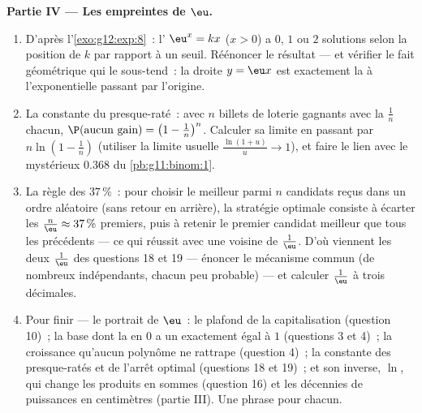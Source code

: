 \begin{problem}
\medskip
\noindent\textbf{Partie IV --- Les empreintes de $\eu$.}
\begin{enumerate}[resume]
  \item D'après l'\cref{exo:g12:exp:8}~: l' $\eu^x = kx$
        ($x > 0$) a $0$, $1$ ou $2$ solutions selon la position de
        $k$ par rapport à un seuil. Réénoncer le résultat --- et
        vérifier le fait géométrique qui le sous-tend~: la droite
        $y = \eu x$ est exactement la  à l'exponentielle
        passant par l'origine.
  \item La constante du presque-raté~: avec $n$ billets de loterie
        gagnants avec la  $\frac1n$ chacun,
        $\P(\text{aucun gain}) = \left(1 - \frac1n\right)^n$.
        Calculer sa limite en passant par
        $n \ln\!\left(1 - \frac1n\right)$ (utiliser la limite
        usuelle $\frac{\ln(1 + u)}{u} \to 1$), et faire le lien avec
        le mystérieux $0.368$ du \cref{pb:g11:binom:1}.
  \item La règle des $37\,\%$~: pour choisir le meilleur parmi $n$
        candidats reçus dans un ordre aléatoire (sans retour en
        arrière), la stratégie optimale consiste à écarter les
        $\frac{n}{\eu} \approx 37\,\%$ premiers, puis à retenir le
        premier candidat meilleur que tous les précédents --- ce qui
        réussit avec une  voisine de $\frac1\eu$. D'où
        viennent les deux $\frac1\eu$ des questions 18 et 19 ---
        énoncer le mécanisme commun (de nombreux 
        indépendants, chacun peu probable) --- et calculer
        $\frac1\eu$ à trois décimales.
  \item Pour finir --- le portrait de $\eu$~: le plafond de la
        capitalisation (question 10)~; la base dont la  en
        $0$ a un  exactement égal à $1$
        (questions 3 et 4)~; la croissance qu'aucun polynôme ne
        rattrape (question 4)~; la constante des presque-ratés et de
        l'arrêt optimal (questions 18 et 19)~; et son inverse,
        $\ln$, qui change les produits en sommes (question 16) et
        les décennies de puissances en centimètres (partie III). Une
        phrase pour chacun.
\end{enumerate}
\end{problem}
